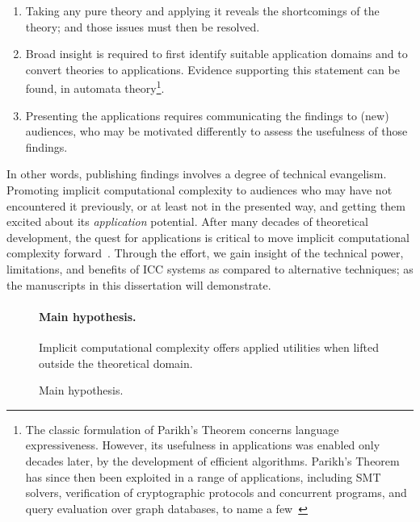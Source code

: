 \begin{enumerate}

\item Taking any pure theory and applying it reveals the shortcomings of the theory;
      and those issues must then be resolved.

\item Broad insight is required to first identify suitable application domains and to convert theories to applications.
Evidence supporting this statement can be found, \eg in automata theory\footnote{
The classic formulation of Parikh's Theorem concerns language expressiveness.
However, its usefulness in applications was enabled {only decades later}, by the development of efficient algorithms.
Parikh's Theorem has since then been exploited in a range of applications, including SMT solvers, verification of cryptographic protocols and concurrent programs, and query evaluation over graph databases, to name a few~\cite[pg. 2]{hague2024}}.

\item Presenting the applications requires communicating the findings to (new) audiences, who may be motivated differently to assess the {usefulness} of those findings.
\end{enumerate}

In other words, publishing findings involves a degree of technical evangelism.
Promoting implicit computational complexity to audiences who may have not encountered it previously, or at least not in the presented way, and getting them excited about its \emph{application} potential.
After many decades of theoretical development, the quest for applications is critical to move implicit computational complexity forward~\cite[p.~7]{moyen2017}.
Through the effort, we gain insight of the technical power, limitations, and benefits of ICC systems as compared to alternative techniques;
as the manuscripts in this dissertation will demonstrate.

\begin{figure}[t]
\begin{mdframed}
\paragraph*{Main hypothesis.}
Implicit computational complexity offers applied utilities when lifted outside the theoretical domain.
\end{mdframed}
\caption[Main hypothesis summarized]{Main hypothesis.}
\label{fig:hypothesis}
\end{figure}

